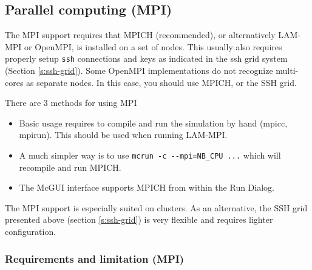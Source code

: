 \subsection{Parallel computing (MPI)}
\label{s:mpi}
The MPI support requires that MPICH (recommended), or alternatively LAM-MPI or 
  OpenMPI, is installed on a set of nodes. This usually also requires properly 
  setup \texttt{ssh} connections and keys as indicated in the ssh grid system 
  (Section \ref{s:ssh-grid}). Some OpenMPI implementations do not recognize 
  multi-cores as separate nodes. In this case, you should use MPICH, or the SSH grid.

There are 3 methods for using MPI
\begin{itemize}
\item Basic usage requires to compile and run the simulation by hand (mpicc, mpirun). 
  This should be used when running LAM-MPI.
\item A much simpler way is to use \verb+mcrun -c --mpi=NB_CPU ...+ which will 
  recompile and run MPICH.
\item The McGUI interface supports MPICH from within the Run Dialog.
\end{itemize}

The MPI support is especially suited on clusters. As an alternative, the SSH grid 
presented above (section \ref{s:ssh-grid}) is very flexible and requires lighter 
configuration.

\subsubsection{Requirements and limitation (MPI)}


